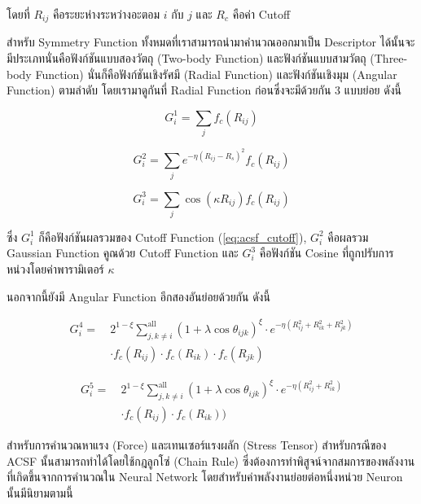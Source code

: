 \noindent โดยที่ $R_{ij}$ คือระยะห่างระหว่างอะตอม $i$ กับ $j$ และ $R_{c}$ คือค่า Cutoff

สำหรับ Symmetry Function ทั้งหมดที่เราสามารถนำมาคำนวณออกมาเป็น Descriptor ได้นั้นจะมีประเภทนั่นคือฟังก์ชันแบบสองวัตถุ
(Two-body Function) และฟังก์ชันแบบสามวัตถุ (Three-body Function) นั่นก็คือฟังก์ชันเชิงรัศมี (Radial Function) และฟังก์ชันเชิงมุม 
(Angular Function) ตามลำดับ โดยเรามาดูกันที่ Radial Function ก่อนซึ่งจะมีด้วยกัน 3 แบบย่อย ดังนี้

\begin{equation}\label{eq:rf_g1}
    G^{1}_{i} = \sum_{j} f_{c}(R_{ij})
\end{equation}

\begin{equation}\label{eq:rf_g2}
    G^{2}_{i} = \sum_{j} e^{-\eta(R_{ij} - R_{s})^{2}} f_{c}(R_{ij})
\end{equation}

\begin{equation}\label{eq:rf_g3}
    G^{3}_{i} = \sum_{j} \cos(\kappa R_{ij}) f_{c}(R_{ij})
\end{equation}

\noindent ซึ่ง $G^{1}_{i}$ ก็คือฟังก์ชันผลรวมของ Cutoff Function (\ref{eq:acsf_cutoff}), $G^{2}_{i}$ คือผลรวม Gaussian 
Function คูณด้วย Cutoff Function และ $G^{3}_{i}$ คือฟังก์ชัน Cosine ที่ถูกปรับการหน่วงโดยค่าพารามิเตอร์ $\kappa$ 

นอกจากนี้ยังมี Angular Function อีกสองอันย่อยด้วยกัน ดังนี้

\begin{align}\label{eq:rf_g4}
    G^{4}_{i} =~&2^{1 - \xi}\sum^{\text{all}}_{j,k \neq i} (1+\lambda \cos \theta_{ijk})^{\xi}
    \cdot e^{-\eta(R^{2}_{ij} + R^{2}_{ik} + R^{2}_{jk})} \nonumber \\
    & \cdot f_{c}(R_{ij}) \cdot f_{c}(R_{ik}) \cdot f_{c}(R_{jk})
\end{align}

\begin{align}\label{eq:rf_g5}
    G^{5}_{i} =~&2^{1 - \xi}\sum^{\text{all}}_{j,k \neq i} (1+\lambda \cos \theta_{ijk})^{\xi}
    \cdot e^{-\eta(R^{2}_{ij} + R^{2}_{ik})} \nonumber \\
    & \cdot f_{c}(R_{ij}) \cdot f_{c}(R_{ik}))
\end{align}

สำหรับการคำนวณหาแรง (Force) และเทนเซอร์แรงผลัก (Stress Tensor) สำหรับกรณีของ ACSF นั้นสามารถทำได้โดยใช้กฎลูกโซ่ (Chain 
Rule) ซึ่งต้องการทำพิสูจน์จากสมการของพลังงานที่เกิดขึ้นจากการคำนวณใน Neural Network โดยสำหรับค่าพลังงานย่อยต่อหนึ่งหน่วย Neuron 
นั้นมีนิยามตามนี้

